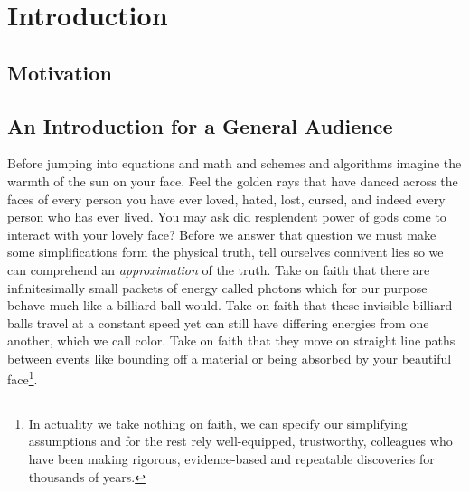 
\chapter{Introduction}
\label{part:intro}


\section{Motivation}


\section{An Introduction for a General Audience}

Before jumping into equations and math and schemes and algorithms imagine the warmth of the sun on your face.
Feel the golden rays that have danced across the faces of every person you have ever loved, hated, lost, cursed, and indeed every person who has ever lived.
You may ask did resplendent power of gods come to interact with your lovely face?
Before we answer that question we must make some simplifications form the physical truth, tell ourselves connivent lies so we can comprehend an \textit{approximation} of the truth.
Take on faith that there are infinitesimally small packets of energy called photons which for our purpose behave much like a billiard ball would.
Take on faith that these invisible billiard balls travel at a constant speed yet can still have differing energies from one another, which we call color.
Take on faith that they move on straight line paths between events like bounding off a material or being absorbed by your beautiful face\footnote{In actuality we take nothing on faith, we can specify our simplifying assumptions and for the rest rely well-equipped, trustworthy, colleagues who have been making rigorous, evidence-based and repeatable discoveries for thousands of years.}.

